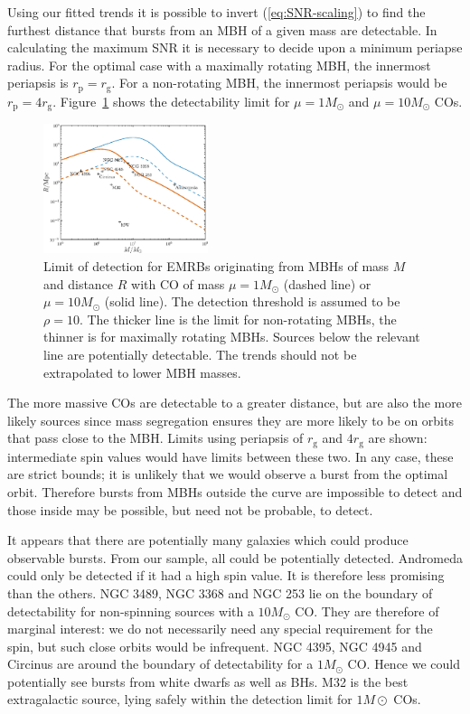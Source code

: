 \documentclass[useAMS,usedcolumn,usegraphicx,usenatbib]{mn2e}
\newcommand{\eqnref}[1]{(\ref{eq:#1})}
\newcommand{\Figref}[1]{Figure~\ref{fig:#1}}
\newcommand{\sub}[1]{\ensuremath{_\mathrm{#1}}}
\begin{document}
Using our fitted trends it is possible to invert \eqnref{SNR-scaling} to find the furthest distance that bursts from an MBH of a given mass are detectable. In calculating the maximum SNR it is necessary to decide upon a minimum periapse radius. For the optimal case with a maximally rotating MBH, the innermost periapsis is $r\sub{p} = r\sub{g}$. For a non-rotating MBH, the innermost periapsis would be $r\sub{p} = 4r\sub{g}$. \Figref{detect} shows the detectability limit for $\mu = 1 M_\odot$ and $\mu = 10 M_\odot$ COs.
\begin{figure}
\begin{center}
 \includegraphics[width=0.43\textwidth]{Fig_M_R_detect_1}
 \caption{Limit of detection for EMRBs originating from MBHs of mass $M$ and distance $R$ with CO of mass $\mu = 1 M_\odot$ (dashed line) or $\mu = 10 M_\odot$ (solid line). The detection threshold is assumed to be $\rho = 10$. The thicker line is the limit for non-rotating MBHs, the thinner is for maximally rotating MBHs. Sources below the relevant line are potentially detectable. The trends should not be extrapolated to lower MBH masses.\label{fig:detect}}
   \end{center}
\end{figure}
The more massive COs are detectable to a greater distance, but are also the more likely sources since mass segregation ensures they are more likely to be on orbits that pass close to the MBH. Limits using periapsis of $r\sub{g}$ and $4r\sub{g}$ are shown: intermediate spin values would have limits between these two. In any case, these are strict bounds; it is unlikely that we would observe a burst from the optimal orbit. Therefore bursts from MBHs outside the curve are impossible to detect and those inside may be possible, but need not be probable, to detect.

It appears that there are potentially many galaxies which could produce observable bursts. From our sample, all could be potentially detected. Andromeda could only be detected if it had a high spin value. It is therefore less promising than the others. NGC 3489, NGC 3368 and NGC 253 lie on the boundary of detectability for non-spinning sources with a $10 M_\odot$ CO. They are therefore of marginal interest: we do not necessarily need any special requirement for the spin, but such close orbits would be infrequent. NGC 4395, NGC 4945 and Circinus are around the boundary of detectability for a $1 M_\odot$ CO. Hence we could potentially see bursts from white dwarfs as well as BHs. M32 is the best extragalactic source, lying safely within the detection limit for $1 M\odot$ COs.
\end{document}

